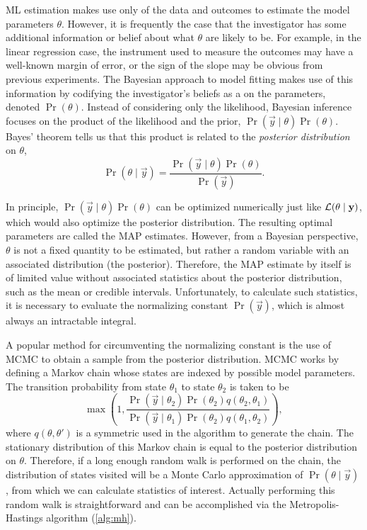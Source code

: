 \Gls{ML} estimation makes use only of the data and outcomes to estimate the
model parameters $\theta$. However, it is frequently the case that the
investigator has some additional information or belief about what $\theta$ are
likely to be. For example, in the linear regression case, the instrument used
to measure the outcomes may have a well-known margin of error, or the sign of
the slope may be obvious from previous experiments. The Bayesian approach to
model fitting makes use of this information by codifying the investigator's
beliefs as a  on the parameters, denoted
$\Pr(\theta)$. Instead of considering only the likelihood, Bayesian inference
focuses on the product of the likelihood and the prior, $\Pr(\vec{y} \mid
\theta) \Pr(\theta)$. Bayes' theorem tells us that this product is related to
the \textit{posterior distribution} on $\theta$,
\[
  \Pr(\theta \mid \vec{y}) = \frac{\Pr(\vec{y} \mid \theta) \Pr(\theta)}
                                  {\Pr(\vec{y})}.
\]

In principle, $\Pr(\vec{y} \mid \theta) \Pr(\theta)$ can be optimized
numerically just like $\mathcal{L}(\theta \mid \mathbf{y})$, which would also optimize the
posterior distribution. The resulting optimal parameters are called the
\gls{MAP} estimates. However, from a Bayesian perspective, $\theta$ is not a
fixed quantity to be estimated, but rather a random variable with an associated
distribution (the posterior). Therefore, the \gls{MAP} estimate by itself is of
limited value without associated statistics about the posterior distribution,
such as the mean or credible intervals. Unfortunately, to calculate such
statistics, it is necessary to evaluate the normalizing constant
$\Pr(\vec{y})$, which is almost always an intractable integral.

A popular method for circumventing the normalizing constant is the use of
\gls{MCMC} to obtain a sample from the posterior distribution. \Gls{MCMC} works
by defining a Markov chain whose states are indexed by possible model
parameters. The transition probability from state $\theta_1$ to state
$\theta_2$ is taken to be
\[
  \max\left(1, \frac{\Pr(\vec{y} \mid \theta_2) \Pr(\theta_2) q(\theta_2, \theta_1)}
                    {\Pr(\vec{y} \mid \theta_1) \Pr(\theta_2) q(\theta_1, \theta_2)} \right),
\]
where $q(\theta, \theta')$ is a symmetric  used in
the algorithm to generate the chain. The stationary distribution of this Markov
chain is equal to the posterior distribution on $\theta$. Therefore, if a long
enough random walk is performed on the chain, the distribution of states
visited will be a Monte Carlo approximation of $\Pr(\theta \mid \vec{y})$, from
which we can calculate statistics of interest. Actually performing this random
walk is straightforward and can be accomplished via the Metropolis-Hastings
algorithm (\cref{alg:mh}).

